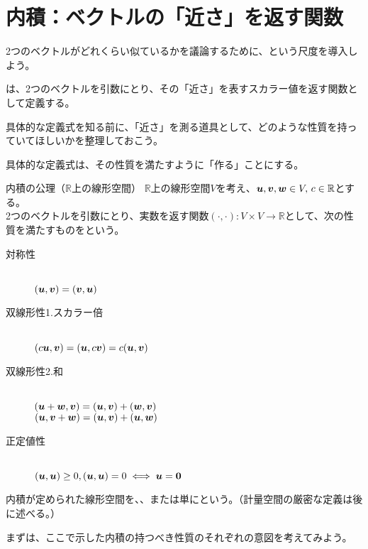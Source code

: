 \documentclass[../../../topic_linear-algebra]{subfiles}
\begin{document}
\sectionline
\section{内積：ベクトルの「近さ」を返す関数}

2つのベクトルがどれくらい似ているかを議論するために、という尺度を導入しよう。

\br

は、2つのベクトルを引数にとり、その「近さ」を表すスカラー値を返す関数として定義する。

\br

具体的な定義式を知る前に、「近さ」を測る道具として、どのような性質を持っていてほしいかを整理しておこう。

具体的な定義式は、その性質を満たすように「作る」ことにする。

\begin{definition}{内積の公理（$\mathbb{R}$上の線形空間）}\label{def:inner-product-axioms}
  $\mathbb{R}$上の線形空間$V$を考え、$\vb*{u}, \vb*{v}, \vb*{w} \in V,\, c \in \mathbb{R} $とする。\\
  2つのベクトルを引数にとり、実数を返す関数$(\cdot, \cdot): V \times V \to \mathbb{R}$として、次の性質を満たすものをという。
  \begin{description}
    \item[対称性]~\\
          $(\vb*{u}, \vb*{v}) = (\vb*{v}, \vb*{u})$
    \item[双線形性1.スカラー倍]~\\
          $(c\vb*{u}, \vb*{v}) = (\vb*{u}, c\vb*{v}) = c(\vb*{u}, \vb*{v})$
    \item[双線形性2.和]~\\
          $(\vb*{u} + \vb*{w}, \vb*{v}) = (\vb*{u}, \vb*{v}) + (\vb*{w}, \vb*{v})$\\
          $(\vb*{u}, \vb*{v} + \vb*{w}) = (\vb*{u}, \vb*{v}) + (\vb*{u}, \vb*{w})$
    \item[正定値性]~\\
          $(\vb*{u}, \vb*{u}) \geq 0, (\vb*{u}, \vb*{u}) = 0 \iff \vb*{u} = \vb*{0}$
  \end{description}
\end{definition}

内積が定められた線形空間を、、または単にという。（計量空間の厳密な定義は後に述べる。）

\br

まずは、ここで示した内積の持つべき性質のそれぞれの意図を考えてみよう。
\end{document}
